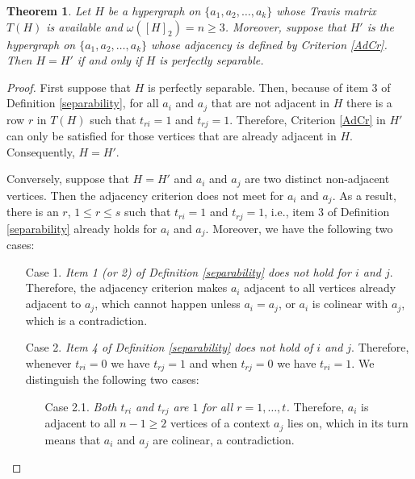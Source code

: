\documentclass[%
12pt,
prereprint,
showpacs,
showkeys,
preprintnumbers,
amsmath,amssymb,
aps,
pra,
longbibliography,
notitlepage
]{revtex4-1}
\newtheorem{theorem}{{\color{THM} Theorem}}%
\theoremstyle{definition}
\begin{document}
        \begin{theorem}\label{reconstruct}
                Let $H$ be a hypergraph on $\{a_1, a_2,\ldots, a_k\}$ whose Travis matrix $T(H)$ is available and $\omega([H]_2 )=n\geq 3$. Moreover, suppose that $H'$ is the hypergraph on $\{a_1, a_2,\ldots, a_k\}$ whose adjacency is defined by Criterion \ref{AdCr}. Then $H=H'$ if and only if $H$ is perfectly separable.
        \end{theorem}
        \begin{proof}
                First suppose that $H$ is perfectly separable. Then, because of item 3 of Definition \ref{separability}, for all $a_i$ and $a_j$ that are not adjacent in $H$ there is a row $r$ in $T(H)$ such that $t_{r i}=1$ and $t_{r j}=1$. Therefore, Criterion \ref{AdCr} in $H'$ can only be satisfied for those vertices that are already adjacent in $H$. Consequently, $H=H'$.

                Conversely, suppose that $H=H'$ and $a_i$ and $a_j$ are two distinct non-adjacent vertices. Then the adjacency criterion does not meet for $a_i$ and $a_j$. As a result, there is an $r$, $1\leq r\leq s$ such that $t_{ri}=1$ and $t_{rj}=1$, i.e., item 3 of Definition \ref{separability} already holds for $a_i$ and $a_j$. Moreover, we have the following two cases:

                \begin{itemize}
                        \item[Case 1.] \emph{Item 1 (or 2) of Definition \ref{separability} does not hold for $i$ and $j$}. Therefore, the adjacency criterion makes $a_i$ adjacent to all vertices already adjacent to $a_j$, which cannot happen unless $a_i = a_j$, or $a_i$ is colinear with $a_j$, which is a contradiction.
                        \item[Case 2.] \emph{Item 4 of Definition \ref{separability} does not hold of $i$ and $j$}. Therefore, whenever $t_{ri}=0$ we have $t_{rj}=1$ and when $t_{rj}=0$ we have $t_{ri}=1$. We distinguish the following two cases:
                        \begin{itemize}
                                \item[Case 2.1.] \emph{Both $t_{ri}$ and $t_{rj}$ are $1$ for all $r=1,\ldots,t$.} Therefore, $a_i$ is adjacent to all $n-1 \geq 2$ vertices of a context $a_j$ lies on, which in its turn means that $a_i$ and $a_j$ are colinear, a contradiction.


\end{itemize}
\end{itemize}
\end{proof}
\end{document}
